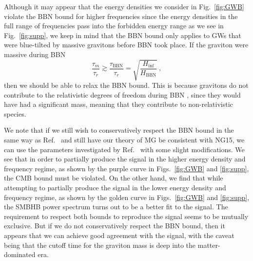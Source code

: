 \documentclass[prd,twocolumn,aps,psfig,nofootinbib,nobibnotes,superscriptaddress,preprintnumbers,times]{revtex4-2}
\begin{document}
Although it may appear that the energy densities we consider in Fig.\ \ref{fig:GWB} violate the BBN bound for higher frequencies since the energy densities in the full range of frequencies pass into the forbidden energy range as we see in Fig.\ \ref{fig:supp}, we keep in mind that the BBN bound only applies to GWs that were blue-tilted by massive gravitons before BBN took place. If the graviton were massive during BBN 
\begin{equation}\label{eqn:massive_bbn}
    \frac{\tau_m}{\tau_r} \gtrsim \frac{\tau_{\text{BBN}}}{\tau_r} = \sqrt{\frac{H_{\inf}}{H_{\text{BBN}}}}\ ,
\end{equation}
then we should be able to relax the BBN bound. This is because gravitons do not contribute to the relativistic degrees of freedom during BBN \cite{Fujita:2018ehq}, since they would have had a significant mass, meaning that they contribute to non-relativistic species.

We note that if we still wish to conservatively respect the BBN bound in the same way as Ref.\ \cite{Fujita:2018ehq} and still have our theory of MG be consistent with NG15, we can use the parameters investigated by Ref.\ \cite{Fujita:2018ehq} with some slight modifications. We see that in order to partially produce the signal in the higher energy density and frequency regime, as shown by the purple curve in Figs.\ \ref{fig:GWB} and \ref{fig:supp}, the CMB bound must be violated. On the other hand, we find that while attempting to partially produce the signal in the lower energy density and frequency regime, as shown by the golden curve in Figs.\ \ref{fig:GWB} and \ref{fig:supp}, the SMBHB power spectrum turns out to be a better fit to the signal. The requirement to respect both bounds to reproduce the signal seems to be mutually exclusive. But if we do not conservatively respect the BBN bound, then it appears that we can achieve good agreement with the signal, with the caveat being that the cutoff time for the graviton mass is deep into the matter-dominated era.
\end{document}

